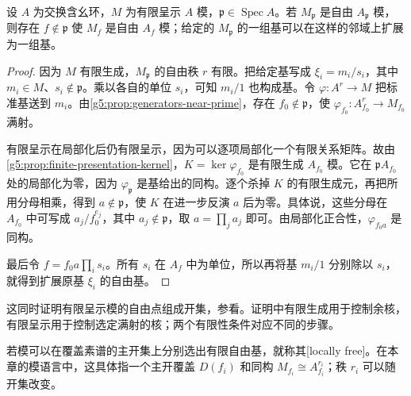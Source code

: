 \begin{lemma}
\label{g5:lem:local-basis-extension}
	设 \(A\) 为交换含幺环，\(M\) 为有限呈示 \(A\) 模，\(\mathfrak p\in\operatorname{Spec}A\)。若 \(M_{\mathfrak p}\) 是自由 \(A_{\mathfrak p}\) 模，则存在 \(f\notin\mathfrak p\) 使 \(M_f\) 是自由 \(A_f\) 模；给定的 \(M_{\mathfrak p}\) 的一组基可以在这样的邻域上扩展为一组基。
\end{lemma}
\begin{proof}
	因为 \(M\) 有限生成，\(M_{\mathfrak p}\) 的自由秩 \(r\) 有限。把给定基写成 \(\xi_i=m_i/s_i\)，其中 \(m_i\in M\)、\(s_i\notin\mathfrak p\)。乘以各自的单位 \(s_i\)，可知 \(m_i/1\) 也构成基。令 \(\varphi:A^r\rightarrow M\) 把标准基送到 \(m_i\)。由\cref{g5:prop:generators-near-prime}，存在 \(f_0\notin\mathfrak p\)，使 \(\varphi_{f_0}:A_{f_0}^r\rightarrow M_{f_0}\) 满射。

	有限呈示在局部化后仍有限呈示，因为可以逐项局部化一个有限关系矩阵。故由\cref{g5:prop:finite-presentation-kernel}，\(K=\ker\varphi_{f_0}\) 是有限生成 \(A_{f_0}\) 模。它在 \(\mathfrak pA_{f_0}\) 处的局部化为零，因为 \(\varphi_{\mathfrak p}\) 是基给出的同构。逐个杀掉 \(K\) 的有限生成元，再把所用分母相乘，得到 \(a\notin\mathfrak p\)，使 \(K\) 在进一步反演 \(a\) 后为零。具体说，这些分母在 \(A_{f_0}\) 中可写成 \(a_j/f_0^{e_j}\)，其中 \(a_j\notin\mathfrak p\)，取 \(a=\prod_j a_j\) 即可。由局部化正合性，\(\varphi_{f_0a}\) 是同构。

	最后令 \(f=f_0a\prod_i s_i\)。所有 \(s_i\) 在 \(A_f\) 中为单位，所以再将基 \(m_i/1\) 分别除以 \(s_i\)，就得到扩展原基 \(\xi_i\) 的自由基。
\end{proof}

这同时证明有限呈示模的自由点组成开集，参看\cite[第4节，定理4.10(ii)]{Matsumura1989}。证明中有限生成用于控制余核，有限呈示用于控制选定满射的核；两个有限性条件对应不同的步骤。

\ProseParagraphBreak

若模可以在覆盖素谱的主开集上分别选出有限自由基，就称其[locally free]。在本章的模语言中，这具体指一个主开覆盖 \(D(f_i)\) 和同构 \(M_{f_i}\cong A_{f_i}^{r_i}\)；秩 \(r_i\) 可以随开集改变。

